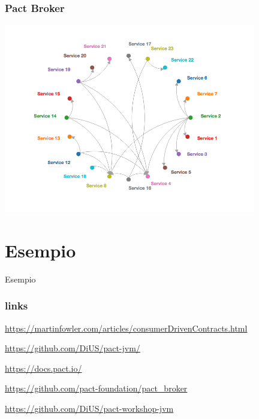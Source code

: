 \documentclass[aspectratio=169]{beamer}
\begin{document}
\begin{frame}
\frametitle{Pact Broker}
\center
\includegraphics[width=11cm]{./images/network_diagram.png}
\end{frame}

\section{Esempio}
\begin{frame}
\center
\Huge
Esempio
\end{frame}

\begin{frame}
\frametitle{links}

\url{https://martinfowler.com/articles/consumerDrivenContracts.html}

\url{https://github.com/DiUS/pact-jvm/}

\url{https://docs.pact.io/}

\url{https://github.com/pact-foundation/pact_broker}

\url{https://github.com/DiUS/pact-workshop-jvm}

\end{frame}
\end{document}
